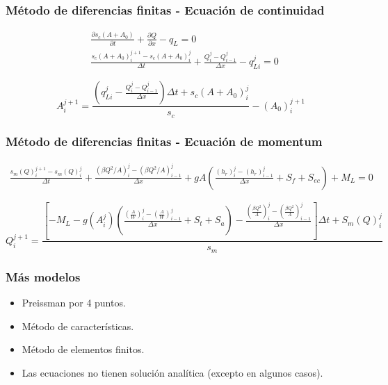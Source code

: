\documentclass[17pt, t, lualatex]{beamer}
\begin{document}
\begin{frame}
  \frametitle{Método de diferencias finitas - Ecuación de continuidad}

  \begin{align*}
  &\frac{\partial s_{c} (A + A_{0})}{\partial t} + \frac{\partial Q}{\partial x} - q_{L} = 0 \\
  &\frac{s_{c} (A + A_{0})_{i}^{j+1} - s_{c}(A + A_{0})_{i}^{j} }{\Delta t} + \frac{Q_{i}^{j} - Q_{i-1}^{j} }{\Delta x} - q_{Li}^{j} = 0   
\end{align*}

  \[
  A_{i}^{j+1} = \frac{\left(q_{Li}^{j} - \frac{Q_{i}^{j} - Q_{i-1}^{j} }{\Delta x}  \right) \Delta t + s_{c} (A + A_{0})_{i}^{j}}{s_{c}} - (A_{0})_{i}^{j+1}
  \]
  
\end{frame}


\begin{frame}
  \frametitle{Método de diferencias finitas - Ecuación de momentum}

  \begin{align*}
  \frac{s_{m} (Q)_{i}^{j+1} - s_{m}(Q)_{i}^{j} }{\Delta t} + \frac{(\beta Q^{2}/A)_{i}^{j} - (\beta Q^{2} /A)_{i-1}^{j} }{\Delta x} + gA \left( \frac{(h_{r})_{i}^{j} - (h_{r})_{i-1}^{j}}{\Delta x} + S_{f} + S_{ec}   \right) + M_{L} = 0   
\end{align*}

  \[
  Q_{i}^{j+1} = \frac{\left[ -M_{L} - g(A_{i}^{j}) \left(\frac{\left(\frac{A}{W}\right)_{i}^{j} - \left(\frac{A}{W}\right)_{i-1}^{j} }{\Delta x} + S_{t} + S_{a}  \right) - \frac{ \left( \frac{\beta Q^{2}}{A} \right)_{i}^{j} - \left( \frac{\beta Q^{2}}{A} \right)_{i-1}^{j}  }{\Delta x}           \right] \Delta t + S_{m} (Q)_{i}^{j}}{s_{m}}
  \]
  
  
\end{frame}


\begin{frame}
  \frametitle{Más modelos}

  \begin{itemize}
    \item Preissman por 4 puntos.
    \item Método de características.
    \item Método de elementos finitos.
    \item Las ecuaciones no tienen solución analítica (excepto en algunos casos).\cite{deaton1999dynamic}
  \end{itemize}
  
\end{frame}
\end{document}
